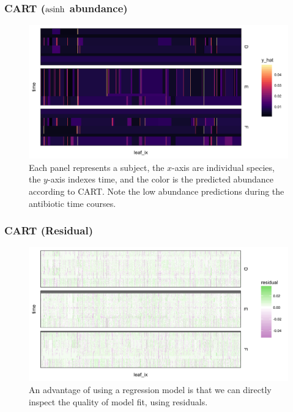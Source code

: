 \documentclass{beamer}
\begin{document}
\begin{frame}
  \frametitle{CART ($\mathop\mathrm{asinh}$ abundance)}
  \begin{figure}[ht]
    \centering
    \includegraphics[width=.8\textwidth]{figure/rpart_complex_2}
    \caption{Each panel represents a subject, the $x$-axis are individual
      species, the $y$-axis indexes time, and the color is the predicted
      abundance according to CART. Note the low abundance predictions during the
      antibiotic time courses. \label{fig:rpart_complex} }
  \end{figure}
\end{frame}

\begin{frame}
  \frametitle{CART (Residual)}
  \begin{figure}[ht]
    \centering
    \includegraphics[width=.8\textwidth]{figure/rpart_complex_2_resid}
    \caption{An advantage of using a regression model is that we can directly
      inspect the quality of model fit, using
      residuals. \label{fig:rpart_complex_resid} }
  \end{figure}
\end{frame}
\end{document}
